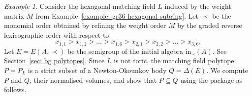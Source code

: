 \documentclass[11pt]{article}
\newcommand{\init}{\text{in}}
\theoremstyle{plain}
\theoremstyle{definition}
\theoremstyle{remark}
\newtheorem{example}[theorem]{Example}
\begin{document}
\begin{example}
    Consider the hexagonal matching field $L$ induced by the weight matrix $M$ from Example~\ref{example: gr36 hexagonal subring}. Let $\prec$ be the monomial order obtained by refining the weight order $M$ by the graded reverse lexicographic order with respect to
    \[
    x_{1,1} > x_{1,2} > \dots > x_{1,6} > x_{2,1} > x_{2,2} > \dots > x_{3,6}.
    \]
    Let $E = E(A, \prec)$ be the semigroup of the initial algebra $\init_\prec(A)$. See Section~\ref{sec: bg polytopes}.
    Since $L$ is not toric, the matching field polytope $P = P_L$ is a strict subset of a Newton-Okounkov body $Q = \Delta(E)$. We compute $P$ and $Q$, their normalised volumes, and show that $P \subseteq Q$ using the package as follows.







\end{example}
\end{document}
